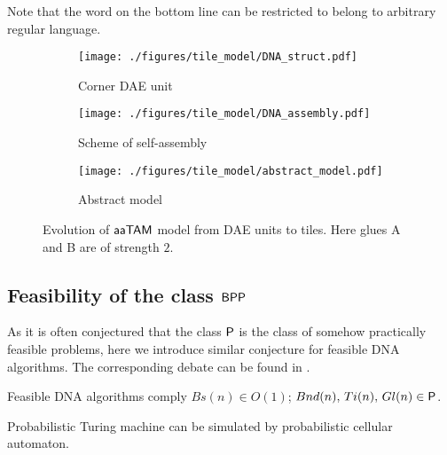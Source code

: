 Note that the word on the bottom line can be restricted to belong to arbitrary regular language.


\begin{figure}[H]
\begin{center}
	\begin{subfigure}[b]{0.31\textwidth}
		\texttt{[image: ./figures/tile\_model/DNA\_struct.pdf]} %
		\caption{Corner DAE unit}
		\label{fig:DNA_struct}
	\end{subfigure}
	\begin{subfigure}[b]{0.472\textwidth}
		\texttt{[image: ./figures/tile\_model/DNA\_assembly.pdf]} %
		\caption{Scheme of self-assembly}
		\label{fig:DNA_assembly}
	\end{subfigure}
	\begin{subfigure}[b]{0.190\textwidth}
		\texttt{[image: ./figures/tile\_model/abstract\_model.pdf]} %
		\caption{Abstract model}
		\label{fig:abstract_model}
	\end{subfigure}
	\caption{Evolution of $\myatam$ model from DAE units to tiles. Here glues {\sf A} and {\sf B} are of strength $2$.}
	\label{fig:evolution}
\end{center}
\end{figure}

\subsection{Feasibility of the class $\BPP$}
	
	As it is often conjectured that the class $\P$ is the class of somehow practically feasible problems, here we introduce similar conjecture for feasible DNA algorithms. The corresponding debate can be found in \cite{book_comp}. %
	
	\begin{conj}   %
		Feasible DNA algorithms comply $Bs(n)\in O(1)$; $Bnd(n),\,Ti(n),\,Gl(n)\in \P$.   %
	\end{conj}
	
	\begin{thm}   %
		Probabilistic Turing machine can be simulated by probabilistic cellular automaton.
	\end{thm}
	
